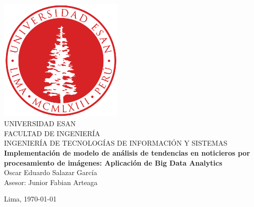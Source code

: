 \documentclass[12pt]{report}
\numberwithin{equation}{chapter} %
\begin{document}
\begin{titlepage}
	\begin{center}
	    \includegraphics[width=0.45\textwidth]{images_repo/esanlogomin}
		\vspace*{2cm} \\
		UNIVERSIDAD ESAN \vspace*{1ex} \\
		FACULTAD DE INGENIERÍA \vspace*{1ex} \\
		INGENIERÍA DE TECNOLOGÍAS DE INFORMACIÓN Y SISTEMAS\vspace*{8ex} \\
		\textbf{Implementación de modelo de análisis de tendencias en noticieros por procesamiento de imágenes: Aplicación de Big Data Analytics}
		\vspace*{8ex}\\	
		
		Oscar Eduardo Salazar García\\
		Asesor: Junior Fabian Arteaga		
		\vfill
		
		Lima, \today 
		
	\end{center}
\end{titlepage}

\renewcommand{\listfigurename}{Índice de Figuras}
\renewcommand{\tablename}{Tabla}
\renewcommand{\listtablename}{Índice de Tablas}

\tableofcontents %


\setcounter{secnumdepth}{3} %
\setcounter{tocdepth}{3}    %

\listoffigures %

\listoftables  %




%
%
%

\appendix
\renewcommand{\appendixname}{Anexos}
\renewcommand{\appendixtocname}{Anexos}
\renewcommand{\appendixpagename}{Anexos}
\clearpage
\addappheadtotoc
\appendixpage


\printbibliography[heading=bibintoc,title={BIBLIOGRAFÍA}]
\end{document}
